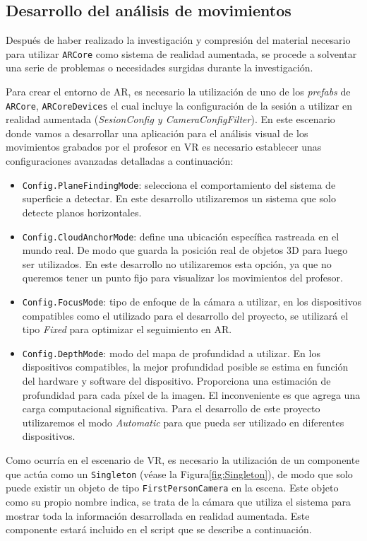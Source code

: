 \subsection{Desarrollo del análisis de movimientos}

Después de haber realizado la investigación y compresión del material necesario para utilizar \texttt{ARCore} como sistema de realidad aumentada, se procede a solventar una serie de problemas o necesidades surgidas durante la investigación.

Para crear el entorno de AR, es necesario la utilización de uno de los \textit{prefabs} de \texttt{ARCore}, \texttt{ARCoreDevices} el cual incluye la configuración de la sesión a utilizar en realidad aumentada (\textit{SesionConfig y CameraConfigFilter}). En este escenario donde vamos a desarrollar una aplicación para el análisis visual de los movimientos grabados por el profesor en VR es necesario establecer unas configuraciones avanzadas detalladas a continuación:

\begin{itemize}
    \item \texttt{Config.PlaneFindingMode}: selecciona el comportamiento del sistema de superficie a detectar. En este desarrollo utilizaremos un sistema que solo detecte planos horizontales.
    \item \texttt{Config.CloudAnchorMode}: define una ubicación específica rastreada en el mundo real. De modo que guarda la posición real de objetos 3D para luego ser utilizados. En este desarrollo no utilizaremos esta opción, ya que no queremos tener un punto fijo para visualizar los movimientos del profesor.
    \item \texttt{Config.FocusMode}: tipo de enfoque de la cámara a utilizar, en los dispositivos compatibles como el utilizado para el desarrollo del proyecto, se utilizará el tipo \textit{Fixed} para optimizar el seguimiento en AR.
    \item \texttt{Config.DepthMode}: modo del mapa de profundidad a utilizar. En los dispositivos compatibles, la mejor profundidad posible se estima en función del hardware y software del dispositivo. Proporciona una estimación de profundidad para cada píxel de la imagen. El inconveniente es que agrega una carga computacional significativa. Para el desarrollo de este proyecto utilizaremos el modo \textit{Automatic} para que pueda ser utilizado en diferentes dispositivos.
\end{itemize}

Como ocurría en el escenario de VR, es necesario la utilización de un componente que actúa como un \texttt{Singleton} (véase la Figura\ref{fig:Singleton}), de modo que solo puede existir un objeto de tipo \texttt{FirstPersonCamera} en la escena. Este objeto como su propio nombre indica, se trata de la cámara que utiliza el sistema para mostrar toda la información desarrollada en realidad aumentada. Este componente estará incluido en el script que se describe a continuación.

